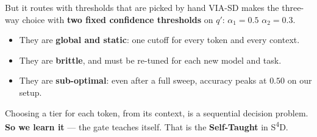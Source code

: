 \documentclass[aspectratio=169,11pt]{beamer}
\begin{document}
\begin{frame}{But it routes with thresholds that are picked by hand}
VIA-SD makes the three-way choice with \textbf{two fixed confidence thresholds} on $q'$:
\quad $\boxed{\alpha_1 = 0.5}$ \quad $\boxed{\alpha_2 = 0.3}$.
\vspace{4pt}
\begin{itemize}
  \item They are \textbf{global and static}: one cutoff for every token and every context.
  \item They are \textbf{brittle}, and must be re-tuned for each new model and task.
  \item They are \textbf{sub-optimal}: even after a full sweep, accuracy peaks at $0.50$ on our setup.
\end{itemize}
\vspace{4pt}
Choosing a tier for each token, from its context, is a sequential decision problem. \textbf{So we learn it} --- the gate teaches itself. That is the \textbf{Self-Taught} in S\textsuperscript{4}D.
\end{frame}

\end{document}
